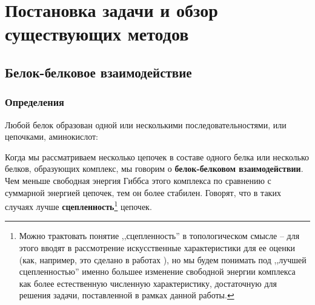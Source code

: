 \graphicspath{{../images/intro/}}
\chapter{Постановка задачи и обзор существующих методов}
\section{Белок-белковое взаимодействие}

\subsection{Определения}
Любой белок образован одной или несколькими последовательностями, или цепочками, аминокислот:


Когда мы рассматриваем несколько цепочек в составе одного белка или несколько белков, образующих комплекс, мы говорим о \textbf{белок-белковом взаимодействии}.
Чем меньше свободная энергия Гиббса этого комплекса по сравнению с суммарной энергией цепочек, тем он более стабилен. Говорят, что в таких случаях лучше \textbf{сцепленность}\footnote{Можно трактовать понятие ,,сцепленность'' в топологическом смысле -- для этого вводят в рассмотрение искусственные характеристики для ее оценки (как, например, это сделано в работах \cite{ialign, pcalign}), но мы будем понимать под ,,лучшей сцепленностью'' именно большее изменение  свободной энергии комплекса как более естественную численную характеристику, достаточную для решения задачи, поставленной в рамках данной работы. } цепочек. 




